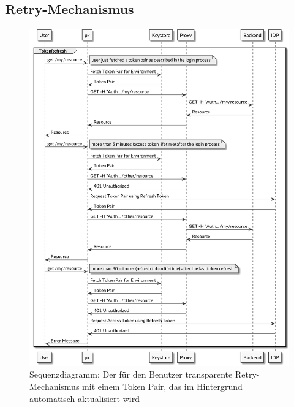 \subsection{Retry-Mechanismus}
\label{sec:Retry-Mechanismus}

\begin{figure}
    \centering
    \includegraphics[width=\linewidth]{pics/sequence-retry.png}
    \caption{Sequenzdiagramm: Der für den Benutzer transparente Retry-Mechanismus mit einem Token Pair, das im Hintergrund automatisch aktualisiert wird}
\end{figure}
